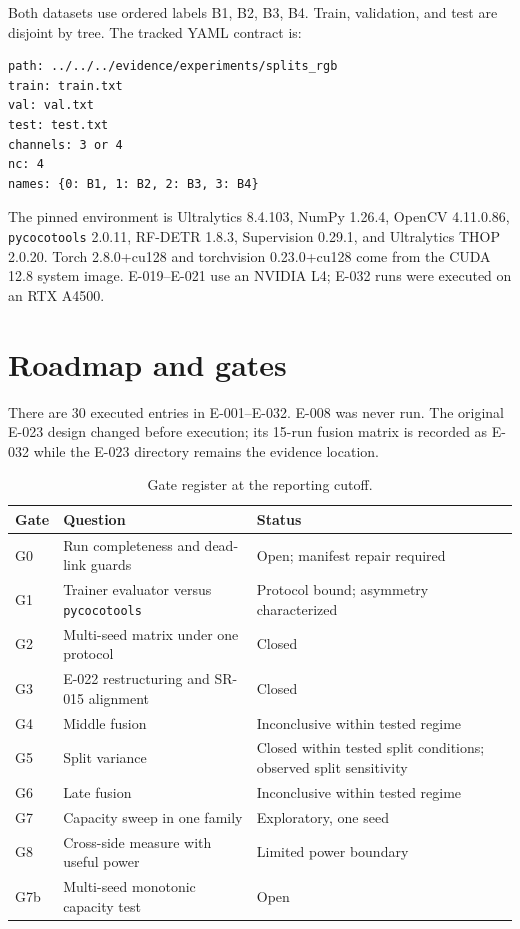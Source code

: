 Both datasets use ordered labels B1, B2, B3, B4. Train, validation, and test
are disjoint by tree. The tracked YAML contract is:
\begin{verbatim}
path: ../../../evidence/experiments/splits_rgb
train: train.txt
val: val.txt
test: test.txt
channels: 3 or 4
nc: 4
names: {0: B1, 1: B2, 2: B3, 3: B4}
\end{verbatim}

The pinned environment is Ultralytics 8.4.103, NumPy 1.26.4, OpenCV
4.11.0.86, \texttt{pycocotools} 2.0.11, RF-DETR 1.8.3, Supervision 0.29.1,
and Ultralytics THOP 2.0.20. Torch 2.8.0+cu128 and torchvision 0.23.0+cu128
come from the CUDA 12.8 system image. E-019--E-021 use an NVIDIA L4; E-032
runs were executed on an RTX A4500.

\section{Roadmap and gates}
\label{sec:roadmap}
There are 30 executed entries in E-001--E-032. E-008 was never run. The
original E-023 design changed before execution; its 15-run fusion matrix is
recorded as E-032 while the E-023 directory remains the evidence location.

\begin{table}[H]
\centering
\caption{Gate register at the reporting cutoff.}
\begin{tabularx}{\columnwidth}{L{0.12\columnwidth}Y L{0.18\columnwidth}}
\toprule
\textbf{Gate} & \textbf{Question} & \textbf{Status}\\
\midrule
G0 & Run completeness and dead-link guards & Open; manifest repair required\\
G1 & Trainer evaluator versus \texttt{pycocotools} & Protocol bound; asymmetry characterized\\
G2 & Multi-seed matrix under one protocol & Closed\\
G3 & E-022 restructuring and SR-015 alignment & Closed\\
G4 & Middle fusion & Inconclusive within tested regime\\
G5 & Split variance & Closed within tested split conditions; observed split sensitivity\\
G6 & Late fusion & Inconclusive within tested regime\\
G7 & Capacity sweep in one family & Exploratory, one seed\\
G8 & Cross-side measure with useful power & Limited power boundary\\
G7b & Multi-seed monotonic capacity test & Open\\
\bottomrule
\end{tabularx}
\end{table}

